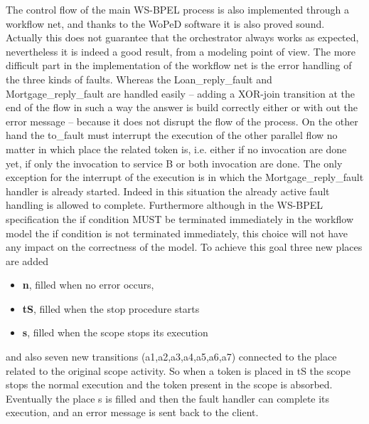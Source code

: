 \documentclass[
10pt, %
a4paper, %
oneside, %
headinclude,footinclude, %
BCOR5mm, %
]{scrartcl}
\begin{document}
The control flow of the main WS-BPEL process is also implemented through
a workflow net, and thanks to the WoPeD software it is also proved sound.
Actually this does not guarantee that the orchestrator always works as expected,
nevertheless it is indeed a good result, from a modeling point of
view.
The more difficult part in the implementation of the workflow net is the
error handling of the three kinds of faults. Whereas the Loan\_reply\_fault
and Mortgage\_reply\_fault are handled easily – adding a XOR-join transition
at the end of the flow in such a way the answer is build correctly either or
with out the error message – because it does not disrupt the flow of the
process.
On the other hand the to\_fault must interrupt the execution of the other
parallel flow no matter in which place the related token is, i.e. either if no invocation
are done yet, if only the invocation to service B or both invocation
are done. The only exception for the interrupt of the execution is in which
the Mortgage\_reply\_fault handler is already started. Indeed in this situation
the already active fault handling is allowed to complete. Furthermore
although in the WS-BPEL specification the if condition MUST be terminated
immediately in the workflow model the if condition is not terminated immediately,
this choice will not have any impact on the correctness of the
model.
To achieve this goal three new places are added
\begin{itemize}


\item \textbf{n}, filled when no error occurs,
\item \textbf{tS}, filled when the stop procedure starts
\item \textbf{s}, filled when the scope stops its execution

\end{itemize}
and also seven new transitions (a1,a2,a3,a4,a5,a6,a7) connected to the place related
to the original scope activity. So when a token is placed in tS the scope
stops the normal execution and the token present in the scope is absorbed.
Eventually the place s is filled and then the fault handler can complete its
execution, and an error message is sent back to the client.
\end{document}
